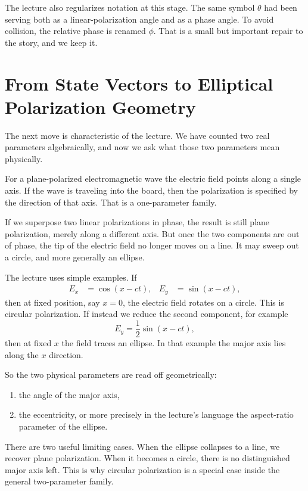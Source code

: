 The lecture also regularizes notation at this stage. The same symbol $\theta$ had been serving both as a linear-polarization angle and as a phase angle. To avoid collision, the relative phase is renamed $\phi$. That is a small but important repair to the story, and we keep it.

\section{From State Vectors to Elliptical Polarization Geometry}

The next move is characteristic of the lecture. We have counted two real parameters algebraically, and now we ask what those two parameters mean physically.

For a plane-polarized electromagnetic wave the electric field points along a single axis. If the wave is traveling into the board, then the polarization is specified by the direction of that axis. That is a one-parameter family.

If we superpose two linear polarizations in phase, the result is still plane polarization, merely along a different axis. But once the two components are out of phase, the tip of the electric field no longer moves on a line. It may sweep out a circle, and more generally an ellipse.

The lecture uses simple examples. If
\begin{align}
E_x&=\cos(x-ct),&
E_y&=\sin(x-ct),
\end{align}
then at fixed position, say $x=0$, the electric field rotates on a circle. This is circular polarization. If instead we reduce the second component, for example
\begin{equation}
E_y=\frac12\sin(x-ct),
\end{equation}
then at fixed $x$ the field traces an ellipse. In that example the major axis lies along the $x$ direction.

So the two physical parameters are read off geometrically:
\begin{enumerate}
\item the angle of the major axis,
\item the eccentricity, or more precisely in the lecture's language the aspect-ratio parameter of the ellipse.
\end{enumerate}

There are two useful limiting cases. When the ellipse collapses to a line, we recover plane polarization. When it becomes a circle, there is no distinguished major axis left. This is why circular polarization is a special case inside the general two-parameter family.

